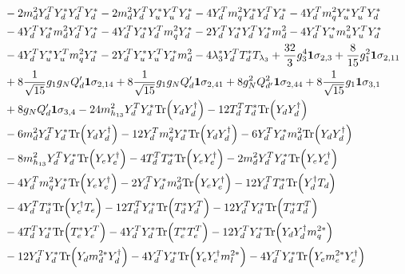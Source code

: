 {\begin{align}
 &-2 {m_d^2  Y_{d}^{T}  Y_d^*  Y_{d}^{T}  Y_d^*} -2 {m_d^2  Y_{d}^{T}  Y_u^*  Y_{u}^{T}  Y_d^*} -4 {Y_{d}^{T}  m_q^2  Y_d^*  Y_{d}^{T}  Y_d^*} -4 {Y_{d}^{T}  m_q^2  Y_u^*  Y_{u}^{T}  Y_d^*} \nonumber \\ 
 &-4 {Y_{d}^{T}  Y_d^*  m_d^2  Y_{d}^{T}  Y_d^*} -4 {Y_{d}^{T}  Y_d^*  Y_{d}^{T}  m_q^2  Y_d^*} -2 {Y_{d}^{T}  Y_d^*  Y_{d}^{T}  Y_d^*  m_d^2} -4 {Y_{d}^{T}  Y_u^*  m_u^2  Y_{u}^{T}  Y_d^*} \nonumber \\ 
 &-4 {Y_{d}^{T}  Y_u^*  Y_{u}^{T}  m_q^2  Y_d^*} -2 {Y_{d}^{T}  Y_u^*  Y_{u}^{T}  Y_d^*  m_d^2} -4 \lambda_3^* {Y_{d}^{T}  T_d^*} T_{\lambda_3} +\frac{32}{3} g_{3}^{4} {\bf 1} \sigma_{2,3} +\frac{8}{15} g_{1}^{2} {\bf 1} \sigma_{2,11} \nonumber \\ 
 &+8 \frac{1}{\sqrt{15}} g_1 g_N Q_d' {\bf 1} \sigma_{2,14} +8 \frac{1}{\sqrt{15}} g_1 g_N Q_d' {\bf 1} \sigma_{2,41} +8 g_{N}^{2} Q_{d'}^{2} {\bf 1} \sigma_{2,44} +8 \frac{1}{\sqrt{15}} g_1 {\bf 1} \sigma_{3,1} \nonumber \\ 
 &+8 g_N Q_d' {\bf 1} \sigma_{3,4} -24 m_{h_{13}}^2 {Y_{d}^{T}  Y_d^*} \mbox{Tr}\Big({Y_d  Y_{d}^{\dagger}}\Big) -12 {T_{d}^{T}  T_d^*} \mbox{Tr}\Big({Y_d  Y_{d}^{\dagger}}\Big) \nonumber \\ 
 &-6 {m_d^2  Y_{d}^{T}  Y_d^*} \mbox{Tr}\Big({Y_d  Y_{d}^{\dagger}}\Big) -12 {Y_{d}^{T}  m_q^2  Y_d^*} \mbox{Tr}\Big({Y_d  Y_{d}^{\dagger}}\Big) -6 {Y_{d}^{T}  Y_d^*  m_d^2} \mbox{Tr}\Big({Y_d  Y_{d}^{\dagger}}\Big) \nonumber \\ 
 &-8 m_{h_{13}}^2 {Y_{d}^{T}  Y_d^*} \mbox{Tr}\Big({Y_e  Y_{e}^{\dagger}}\Big) -4 {T_{d}^{T}  T_d^*} \mbox{Tr}\Big({Y_e  Y_{e}^{\dagger}}\Big) -2 {m_d^2  Y_{d}^{T}  Y_d^*} \mbox{Tr}\Big({Y_e  Y_{e}^{\dagger}}\Big) \nonumber \\ 
 &-4 {Y_{d}^{T}  m_q^2  Y_d^*} \mbox{Tr}\Big({Y_e  Y_{e}^{\dagger}}\Big) -2 {Y_{d}^{T}  Y_d^*  m_d^2} \mbox{Tr}\Big({Y_e  Y_{e}^{\dagger}}\Big) -12 {Y_{d}^{T}  T_d^*} \mbox{Tr}\Big({Y_{d}^{\dagger}  T_d}\Big) \nonumber \\ 
 &-4 {Y_{d}^{T}  T_d^*} \mbox{Tr}\Big({Y_{e}^{\dagger}  T_e}\Big) -12 {T_{d}^{T}  Y_d^*} \mbox{Tr}\Big({T_d^*  Y_{d}^{T}}\Big) -12 {Y_{d}^{T}  Y_d^*} \mbox{Tr}\Big({T_d^*  T_{d}^{T}}\Big) \nonumber \\ 
 &-4 {T_{d}^{T}  Y_d^*} \mbox{Tr}\Big({T_e^*  Y_{e}^{T}}\Big) -4 {Y_{d}^{T}  Y_d^*} \mbox{Tr}\Big({T_e^*  T_{e}^{T}}\Big) -12 {Y_{d}^{T}  Y_d^*} \mbox{Tr}\Big({Y_d  Y_{d}^{\dagger}  m_q^{2 *}}\Big) \nonumber \\ 
 &-12 {Y_{d}^{T}  Y_d^*} \mbox{Tr}\Big({Y_d  m_d^{2 *}  Y_{d}^{\dagger}}\Big) -4 {Y_{d}^{T}  Y_d^*} \mbox{Tr}\Big({Y_e  Y_{e}^{\dagger}  m_l^{2 *}}\Big) -4 {Y_{d}^{T}  Y_d^*} \mbox{Tr}\Big({Y_e  m_e^{2 *}  Y_{e}^{\dagger}}\Big) \\ 

\end{align}}
